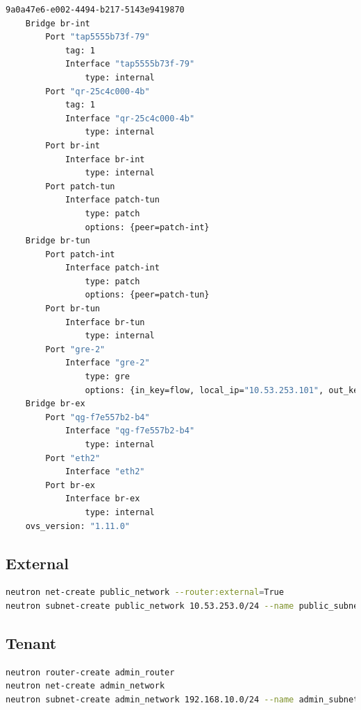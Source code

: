 \documentclass[11pt,letterpaper,oneside]{book}
\begin{document}
\begin{lstlisting}[caption={Neutron Node Open vSwtich},language=bash]
9a0a47e6-e002-4494-b217-5143e9419870
    Bridge br-int
        Port "tap5555b73f-79"
            tag: 1
            Interface "tap5555b73f-79"
                type: internal
        Port "qr-25c4c000-4b"
            tag: 1
            Interface "qr-25c4c000-4b"
                type: internal
        Port br-int
            Interface br-int
                type: internal
        Port patch-tun
            Interface patch-tun
                type: patch
                options: {peer=patch-int}
    Bridge br-tun
        Port patch-int
            Interface patch-int
                type: patch
                options: {peer=patch-tun}
        Port br-tun
            Interface br-tun
                type: internal
        Port "gre-2"
            Interface "gre-2"
                type: gre
                options: {in_key=flow, local_ip="10.53.253.101", out_key=flow, remote_ip="10.53.253.71"}
    Bridge br-ex
        Port "qg-f7e557b2-b4"
            Interface "qg-f7e557b2-b4"
                type: internal
        Port "eth2"
            Interface "eth2"
        Port br-ex
            Interface br-ex
                type: internal
    ovs_version: "1.11.0"
\end{lstlisting}


\subsection{External}
\begin{lstlisting}[caption={Create public network and subnet},language=bash]
neutron net-create public_network --router:external=True
neutron subnet-create public_network 10.53.253.0/24 --name public_subnet --enable_dhcp=False --allocation-pool start=10.53.253.150,end=10.53.253.160 --gateway=10.53.253.1
\end{lstlisting}

\subsection{Tenant}
\begin{lstlisting}[caption={Create admin tenant router, network and subnet},language=bash]
neutron router-create admin_router
neutron net-create admin_network
neutron subnet-create admin_network 192.168.10.0/24 --name admin_subnet
\end{lstlisting}
\end{document}
